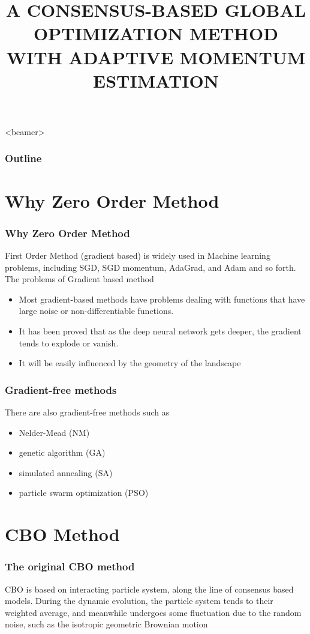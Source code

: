 \documentclass{beamer}
\begin{document}
\title[Adam-CBO]{A CONSENSUS-BASED GLOBAL OPTIMIZATION
METHOD WITH ADAPTIVE MOMENTUM ESTIMATION}
\frame{\titlepage}

\begin{frame}<beamer>
	\frametitle{\textbf{Outline}}
	\tableofcontents[]
\end{frame}

\section{Why Zero Order Method}
\begin{frame}
	\frametitle{Why Zero Order Method}
	First Order Method (gradient based) is widely used in Machine learning problems, including 
	SGD, SGD momentum, AdaGrad, and  Adam and so forth.
	The problems of Gradient based method 
	\begin{itemize}
		\item Most gradient-based methods have problems dealing with functions that have large noise or non-differentiable functions.
		\item  It has been proved that as the
		deep neural network gets deeper, the gradient tends to explode or vanish.
		\item It will be easily influenced by the geometry of the landscape
	\end{itemize}
\end{frame}

\begin{frame}
	\frametitle{Gradient-free methods}
	There are also gradient-free methods such as
	\begin{itemize}
		\item Nelder-Mead (NM)
		\item genetic algorithm (GA)
		\item simulated annealing (SA)
		\item particle swarm optimization (PSO)
	\end{itemize}
\end{frame}

\section{CBO Method}
\begin{frame}
	\frametitle{The original CBO method}
   CBO is based on interacting particle system, along the line of consensus based models. 
   During the dynamic evolution, the particle system tends to their weighted average, and meanwhile undergoes some fluctuation due to the random noise, such as the isotropic geometric Brownian motion
   
\end{frame}
\end{document}
